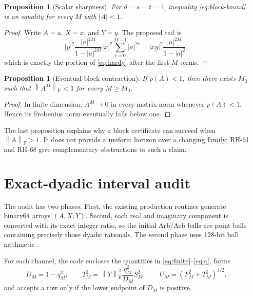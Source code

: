 \documentclass[11pt]{article}
\newtheorem{proposition}[theorem]{Proposition}
\theoremstyle{definition}
\newcommand{\norm}[1]{\left\lVert#1\right\rVert}
\newcommand{\F}{\mathrm F}
\begin{document}
\begin{proposition}[Scalar sharpness]
\label{prop:sharp}
For $d=s=t=1$, inequality \eqref{eq:block-bound} is an equality for every
$M$ with $|A|<1$.
\end{proposition}

\begin{proof}
Write $A=a$, $X=x$, and $Y=y$.  The proposed tail is
\[
 |y|^2\frac{|a|^{2M}}{1-|a|^{2M}}
 |x|^2\sum_{r=0}^{M-1}|a|^{2r}
 =|xy|^2\frac{|a|^{2M}}{1-|a|^2},
\]
which is exactly the portion of \eqref{eq:hardy} after the first $M$ terms.
\end{proof}

\begin{proposition}[Eventual block contraction]
\label{prop:eventual}
If $\rho(A)<1$, then there exists $M_0$ such that
$\norm{A^M}_{\F}<1$ for every $M\ge M_0$.
\end{proposition}

\begin{proof}
In finite dimension, $A^M\to0$ in every matrix norm whenever
$\rho(A)<1$.  Hence its Frobenius norm eventually falls below one.
\end{proof}

The last proposition explains why a block certificate can succeed when
$\norm A_{\F}>1$.  It does not provide a uniform horizon over a changing
family; RH-61 and RH-68 give complementary obstructions to such a claim.

\section{Exact-dyadic interval audit}
\label{sec:interval}

The audit has two phases.  First, the existing production routines generate
binary64 arrays $(A,X,Y)$.  Second, each real and imaginary component is
converted with its exact integer ratio, so the initial Arb/Acb balls are
point balls containing precisely those dyadic rationals.  The second phase
uses 128-bit ball arithmetic \citep{Johansson2017}.

For each channel, the code encloses the quantities in
\eqref{eq:finite}--\eqref{eq:q}, forms
\begin{equation}
 D_M=1-q_M^2,
 \qquad
 T_M^2=\norm{Y}_{\F}^2\frac{q_M^2}{D_M}S_M^2,
 \qquad
 U_M=(F_M^2+T_M^2)^{1/2},
 \label{eq:interval-quantities}
\end{equation}
and accepts a row only if the lower endpoint of $D_M$ is positive.
\end{document}
